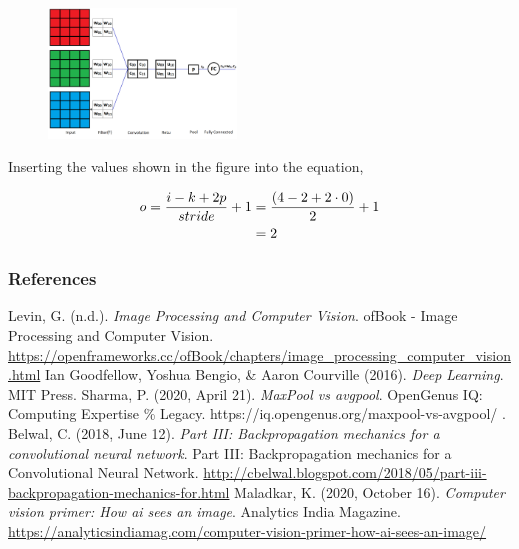\begin{vbframe}
 \begin{figure}
    \centering
    \includegraphics[width=5cm]{figure/3channel.png}
  \end{figure}

Inserting the values shown in the figure into the equation,

\begin{align} 
o= \frac{i - k + 2p}{stride} + 1&={(4 - 2 + 2 \cdot 0)\over 2} + 1\\ 
&=2 
\end{align}

\end{vbframe}

\begin{vbframe}
\frametitle{References}
\footnotesize{
\begin{thebibliography}{99}
 Levin, G. (n.d.). \textit{Image Processing and Computer Vision}. ofBook - Image Processing and Computer Vision. \url{https://openframeworks.cc/ofBook/chapters/image_processing_computer_vision.html}
 Ian Goodfellow, Yoshua Bengio, \& Aaron Courville (2016). \textit{Deep Learning}. MIT Press.
 Sharma, P. (2020, April 21). \textit{MaxPool vs avgpool}. OpenGenus IQ: Computing Expertise \% Legacy. https://iq.opengenus.org/maxpool-vs-avgpool/ .
 Belwal, C. (2018, June 12). \textit{Part III: Backpropagation mechanics for a convolutional neural network}. Part III: Backpropagation mechanics for a Convolutional Neural Network. \url{http://cbelwal.blogspot.com/2018/05/part-iii-backpropagation-mechanics-for.html} 
 Maladkar, K. (2020, October 16). \textit{Computer vision primer: How ai sees an image}. Analytics India Magazine. \url{https://analyticsindiamag.com/computer-vision-primer-how-ai-sees-an-image/} 
\end{thebibliography}
}
\end{vbframe}


\endlecture

